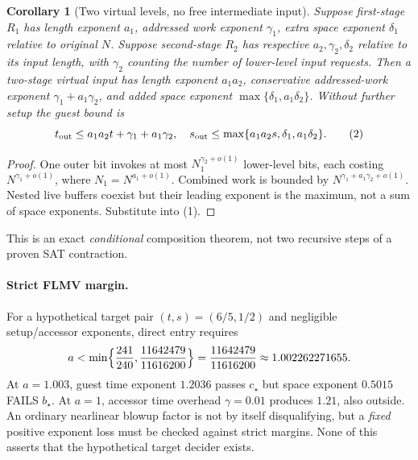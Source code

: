 \documentclass[11pt]{article}
\newtheorem{corollary}[theorem]{Corollary}
\begin{document}
\begin{corollary}[Two virtual levels, no free intermediate input]
Suppose first-stage $R_1$ has length exponent $a_1$, addressed
work exponent $\gamma_1$, extra space exponent $\delta_1$ relative
to original $N$. Suppose second-stage $R_2$ has respective
$a_2,\gamma_2,\delta_2$ relative to its input length, with
$\gamma_2$ counting the number of lower-level input requests.
Then a two-stage virtual input has length exponent $a_1a_2$,
conservative addressed-work exponent $\gamma_1+a_1\gamma_2$,
and added space exponent $\max\{\delta_1,a_1\delta_2\}$.
Without further setup the guest bound is
\[
 t_{\rm out}\le a_1a_2t+\gamma_1+a_1\gamma_2,\quad
 s_{\rm out}\le\max\{a_1a_2s,\delta_1,a_1\delta_2\}.\tag{2}
\]
\end{corollary}
\begin{proof}
One outer bit invokes at most $N_1^{\gamma_2+o(1)}$
lower-level bits, each costing $N^{\gamma_1+o(1)}$,
where $N_1=N^{a_1+o(1)}$. Combined work is bounded by
$N^{\gamma_1+a_1\gamma_2+o(1)}$.
Nested live buffers coexist but their leading exponent is
the maximum, not a sum of space exponents. Substitute into (1).
\end{proof}
This is an exact \emph{conditional} composition theorem, not
two recursive steps of a proven SAT contraction.

\paragraph{Strict FLMV margin.}
For a hypothetical target pair $(t,s)=(6/5,1/2)$ and negligible
setup/accessor exponents, direct entry requires
\[
 a<\min\Bigl\{\frac{241}{240},
 \frac{11642479}{11616200}\Bigr\}
 =\frac{11642479}{11616200}\approx1.002262271655.
\]
At $a=1.003$, guest time exponent $1.2036$ passes
$c_\star$ but space exponent $0.5015$ FAILS $b_\star$.
At $a=1$, accessor time overhead $\gamma=0.01$
produces $1.21$, also outside. An ordinary nearlinear blowup
factor is not by itself disqualifying, but a \emph{fixed}
positive exponent loss must be checked against strict margins.
None of this asserts that the hypothetical target decider exists.
\end{document}
